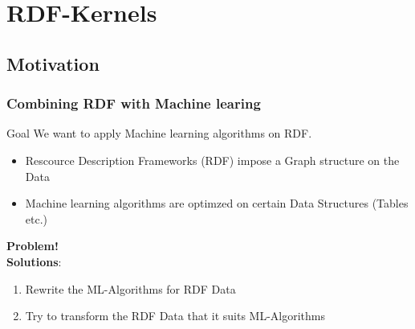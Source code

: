 \section{RDF-Kernels}
\subsection{Motivation}
\begin{frame}[fragile,t]
\frametitle{Combining RDF with Machine learing}
\begin{block}{Goal}
We want to apply Machine learning algorithms on RDF.
\end{block}
\pause
\begin{comment}
\begin{center}

\begin{tikzpicture}
  \draw[thick,rounded corners=1pt] (1,2.5) -- (3,3);
  \draw[thick,rounded corners=1pt] (1,1) -- (3,3);
  \draw[thick,rounded corners=1pt] (3,1) -- (3,3);
  \draw[thick,rounded corners=1pt] (3,1) -- (1,1);
  \draw[thick,rounded corners=1pt] (1,2.5) -- (0,1.5);
  \draw[thick,rounded corners=1pt] (1,2.5) -- (3,3);
  \draw[thick,rounded corners=1pt] (1,1) -- (0,1.5);
  \draw[fill=gray] (1,2.5) circle (0.25cm);
  \draw[fill=gray] (3,3) circle (0.25cm);
  \draw[fill=gray] (1,1) circle (0.25cm);
  \draw[fill=gray] (3,1) circle (0.25cm);
  \draw[fill=gray] (0,1.5) circle (0.25cm);
  \end{tikzpicture}

\end{center}
\end{comment}
\begin{itemize}
\item Rescource Description Frameworks (RDF) impose a Graph structure on the Data \pause
\item Machine learning algorithms are optimzed on certain Data Structures (Tables etc.)
\end{itemize}
\textbf{Problem!}
\pause
\\
\textbf{Solutions}:
\begin{enumerate}
\item Rewrite the ML-Algorithms for RDF Data
\item Try to transform the RDF Data that it suits ML-Algorithms
\end{enumerate}

\end{frame}
